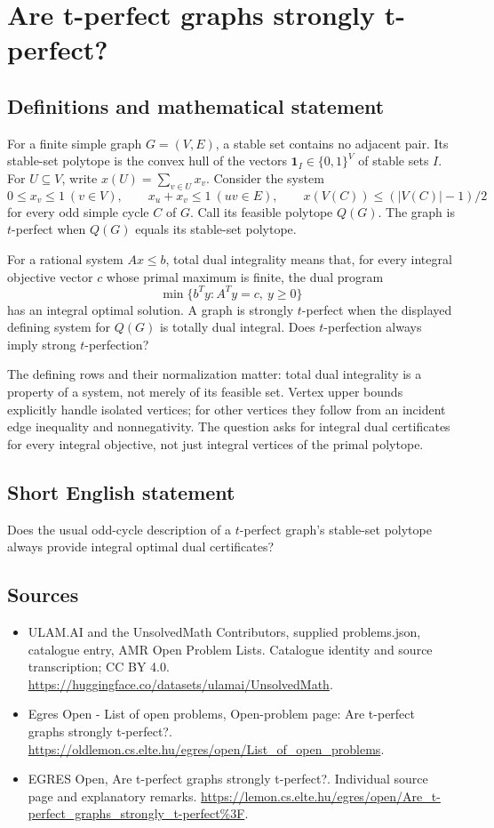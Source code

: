 \documentclass[11pt,a4paper]{article}
\begin{document}
\section*{Are t-perfect graphs strongly t-perfect?}\label{statement}

\subsection{Definitions and mathematical statement}
For a finite simple graph $G=(V,E)$, a stable set contains no adjacent
pair. Its stable-set polytope is the convex hull of the vectors
$\mathbf1_I\in\{0,1\}^V$ of stable sets $I$. For $U\subseteq V$, write
$x(U)=\sum_{v\in U}x_v$. Consider the system
\[
 0\le x_v\le1\ (v\in V),\qquad x_u+x_v\le1\ (uv\in E),
 \qquad x(V(C))\le (|V(C)|-1)/2
\]
for every odd simple cycle $C$ of $G$. Call its feasible polytope $Q(G)$.
The graph is $t$-perfect when $Q(G)$ equals its stable-set polytope.

For a rational system $Ax\le b$, total dual integrality means that, for
every integral objective vector $c$ whose primal maximum is finite, the
dual program
\[
             \min\{b^Ty:A^Ty=c,\ y\ge0\}
\]
has an integral optimal solution. A graph is strongly $t$-perfect when
the displayed defining system for $Q(G)$ is totally dual integral.
Does $t$-perfection always imply strong $t$-perfection?

The defining rows and their normalization matter: total dual integrality
is a property of a system, not merely of its feasible set. Vertex upper
bounds explicitly handle isolated vertices; for other vertices they follow
from an incident edge inequality and nonnegativity. The question asks for
integral dual certificates for every integral objective, not just integral
vertices of the primal polytope.
\subsection{Short English statement}
Does the usual odd-cycle description of a $t$-perfect graph's
stable-set polytope always provide integral optimal dual certificates?
\subsection{Sources}
\begin{itemize}
\item[S1] ULAM.AI and the UnsolvedMath Contributors, supplied problems.json, catalogue entry, AMR Open Problem Lists. Catalogue identity and source transcription; CC BY 4.0.
\url{https://huggingface.co/datasets/ulamai/UnsolvedMath}.
\item[S2] Egres Open - List of open problems, Open-problem page: Are t-perfect graphs strongly t-perfect?. 
\url{https://oldlemon.cs.elte.hu/egres/open/List_of_open_problems}.
\item[S3] EGRES Open, Are t-perfect graphs strongly t-perfect?. Individual source page and explanatory remarks.
\url{https://lemon.cs.elte.hu/egres/open/Are_t-perfect_graphs_strongly_t-perfect%3F}.
\end{itemize}
\end{document}
